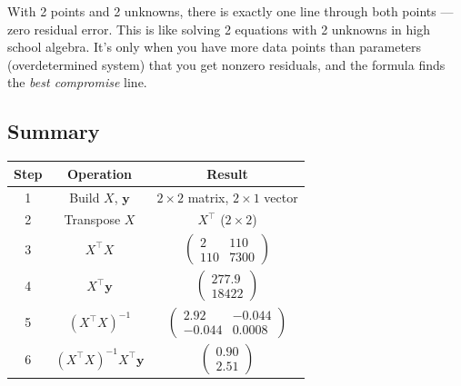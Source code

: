 \documentclass[11pt, a4paper]{article}
\newcommand{\gut}[1]{\begin{tcolorbox}[colback=lightyellow, colframe=orange!50, title=Gut feeling]#1\end{tcolorbox}}
\begin{document}
\gut{
With 2 points and 2 unknowns, there is exactly one line through both points --- zero residual error. This is like solving 2 equations with 2 unknowns in high school algebra. It's only when you have more data points than parameters (overdetermined system) that you get nonzero residuals, and the formula finds the \emph{best compromise} line.
}


\subsection*{Summary}

\begin{center}
\renewcommand{\arraystretch}{1.3}
\begin{tabular}{ccc}
\toprule
\textbf{Step} & \textbf{Operation} & \textbf{Result} \\
\midrule
1 & Build $X$, $\mathbf{y}$ & $2\times2$ matrix, $2\times1$ vector \\
2 & Transpose $X$ & $X^\top$ ($2\times2$) \\
3 & $X^\top X$ & $\begin{pmatrix} 2 & 110 \\ 110 & 7300 \end{pmatrix}$ \\
4 & $X^\top \mathbf{y}$ & $\begin{pmatrix} 277.9 \\ 18422 \end{pmatrix}$ \\
5 & $(X^\top X)^{-1}$ & $\begin{pmatrix} 2.92 & -0.044 \\ -0.044 & 0.0008 \end{pmatrix}$ \\
6 & $(X^\top X)^{-1} X^\top \mathbf{y}$ & $\begin{pmatrix} 0.90 \\ 2.51 \end{pmatrix}$ \\
\bottomrule
\end{tabular}
\end{center}
\end{document}
